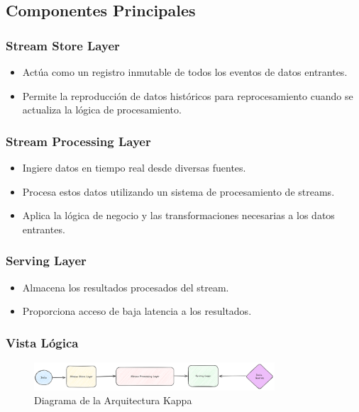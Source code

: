 \newpage
\subsection{Componentes Principales}

\subsubsection{Stream Store Layer}
\begin{itemize}
    \item Actúa como un registro inmutable de todos los eventos de datos entrantes.
    \item Permite la reproducción de datos históricos para reprocesamiento cuando se actualiza la lógica de procesamiento.
\end{itemize}

\subsubsection{Stream Processing Layer}
\begin{itemize}
    \item Ingiere datos en tiempo real desde diversas fuentes.
    \item Procesa estos datos utilizando un sistema de procesamiento de streams.
    \item Aplica la lógica de negocio y las transformaciones necesarias a los datos entrantes.
\end{itemize}

\subsubsection{Serving Layer}
\begin{itemize}
    \item Almacena los resultados procesados del stream.
    \item Proporciona acceso de baja latencia a los resultados.
\end{itemize}

\newpage
\subsubsection{Vista Lógica}
\begin{figure}[h]
\centering
\includegraphics[width=0.8\textwidth]{teorico/kappa.png}
\caption{Diagrama de la Arquitectura Kappa}
\label{fig:arquitectura_kappa}
\end{figure}

